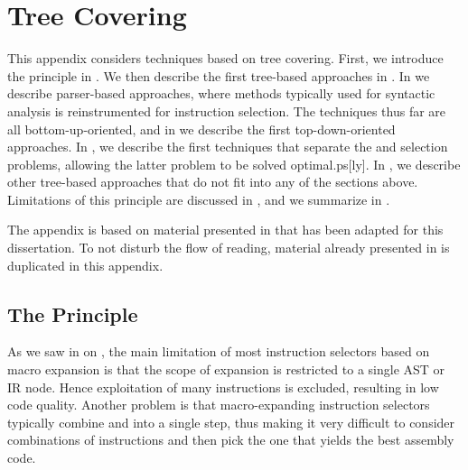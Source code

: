 %

\chapter{Tree Covering}

This appendix considers techniques based on \gls{tree covering}.
%
First, we introduce the principle in .
%
We then describe the first \gls{tree}-based approaches in
.
%
In  we describe parser-based
approaches, where methods typically used for \gls{syntactic analysis} is
reinstrumented for \gls{instruction selection}.
%
The techniques thus far are all bottom-up-oriented, and in
 we describe the first top-down-oriented
approaches.
%
In , we describe the first
techniques that separate the  and \glspl{selection
  problem}, allowing the latter problem to be solved \gls{optimal.ps}[ly].
%
In , we describe other
\gls{tree}-based approaches that do not fit into any of the sections above.
%
Limitations of this principle are discussed in , and
we summarize in .

The appendix is based on material presented in
\cite[Chap.]{HjortBlindell:2016:Survey} that has been adapted for
this dissertation.
%
To not disturb the flow of reading, material already presented in
 is duplicated in this appendix.


\section{The Principle}

As we saw in  on ,
the main limitation of most \glspl{instruction selector} based on \gls{macro
  expansion} is that the scope of expansion is restricted to a single \gls{AST}
or \gls{IR} \gls{node}.
%
Hence exploitation of many \glspl{instruction} is excluded, resulting in low
code quality.
%
Another problem is that \gls{macro}-expanding \glspl{instruction selector}
typically combine  and 
into a single step, thus making it very difficult to consider combinations of
\glspl{instruction} and then pick the one that yields the best \gls{assembly
  code}.

